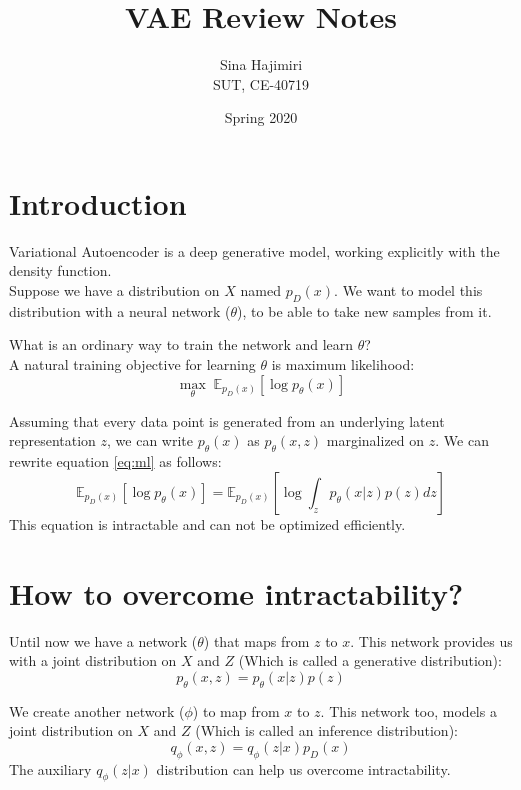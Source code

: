 \documentclass{article}
\title{VAE Review Notes}
\author{Sina Hajimiri \\SUT, CE-40719}
\date{Spring 2020}
\begin{document}
\maketitle

\section{Introduction}
Variational Autoencoder is a deep generative model, working explicitly with the density function. \\
Suppose we have a distribution on $X$ named $p_D(x)$. We want to model this distribution with a neural network ($\theta$), to be able to take new samples from it.

What is an ordinary way to train the network and learn $\theta$? \\
A natural training objective for learning $\theta$ is maximum likelihood:
\begin{equation}
    \label{eq:ml}
    \underset{\theta}{\max} \; \mathbb{E}_{p_D(x)}[\log p_\theta(x)]
\end{equation}

Assuming that every data point is generated from an underlying latent representation $z$, we can write $p_\theta(x)$ as $p_\theta(x, z)$ marginalized on $z$. We can rewrite equation \ref{eq:ml} as follows:
\begin{equation}
    \label{eq:intractable}
    \mathbb{E}_{p_D(x)}[\log p_\theta(x)] = \mathbb{E}_{p_D(x)}[\log \int_z p_\theta(x|z) p(z) dz]
\end{equation}
This equation is intractable and can not be optimized efficiently.

\section{How to overcome intractability?}
Until now we have a network ($\theta$) that maps from $z$ to $x$. This network provides us with a joint distribution on $X$ and $Z$ (Which is called a generative distribution):
\begin{equation}
    p_\theta(x, z) = p_\theta(x|z) p(z)
\end{equation}

We create another network ($\phi$) to map from $x$ to $z$. This network too, models a joint distribution on $X$ and $Z$ (Which is called an inference distribution):
\begin{equation}
    q_\phi(x, z) = q_\phi(z|x) p_D(x)
\end{equation}
The auxiliary $q_\phi(z|x)$ distribution can help us overcome intractability.
\end{document}

